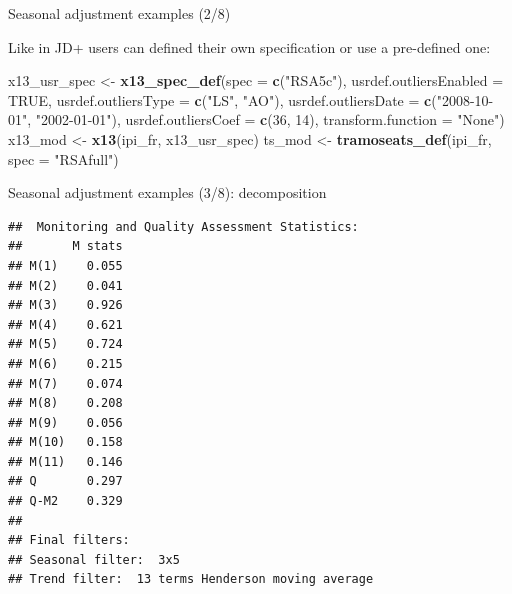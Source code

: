 \documentclass[10pt,xcolor=table,color={dvipsnames,usenames},ignorenonframetext,usepdftitle=false,french]{beamer}
\newenvironment{Shaded}{\begin{snugshade}}{\end{snugshade}}
\newcommand{\DataTypeTok}[1]{\textcolor[rgb]{0.13,0.29,0.53}{#1}}
\newcommand{\DecValTok}[1]{\textcolor[rgb]{0.00,0.00,0.81}{#1}}
\newcommand{\KeywordTok}[1]{\textcolor[rgb]{0.13,0.29,0.53}{\textbf{#1}}}
\newcommand{\NormalTok}[1]{#1}
\newcommand{\OperatorTok}[1]{\textcolor[rgb]{0.81,0.36,0.00}{\textbf{#1}}}
\newcommand{\OtherTok}[1]{\textcolor[rgb]{0.56,0.35,0.01}{#1}}
\newcommand{\StringTok}[1]{\textcolor[rgb]{0.31,0.60,0.02}{#1}}
\begin{document}
\begin{frame}[fragile]{Seasonal adjustment examples (2/8)}
\protect\hypertarget{seasonal-adjustment-examples-28}{}

Like in JD+ users can defined their own specification or use a
pre-defined one:

\footnotesize

\begin{Shaded}
\begin{Highlighting}[]
\NormalTok{x13_usr_spec <-}\StringTok{ }\KeywordTok{x13_spec_def}\NormalTok{(}\DataTypeTok{spec =} \KeywordTok{c}\NormalTok{(}\StringTok{"RSA5c"}\NormalTok{),}
                             \DataTypeTok{usrdef.outliersEnabled =} \OtherTok{TRUE}\NormalTok{,}
                             \DataTypeTok{usrdef.outliersType =} \KeywordTok{c}\NormalTok{(}\StringTok{"LS"}\NormalTok{, }\StringTok{"AO"}\NormalTok{),}
                             \DataTypeTok{usrdef.outliersDate =} \KeywordTok{c}\NormalTok{(}\StringTok{"2008-10-01"}\NormalTok{,}
                                                     \StringTok{"2002-01-01"}\NormalTok{),}
                             \DataTypeTok{usrdef.outliersCoef =} \KeywordTok{c}\NormalTok{(}\DecValTok{36}\NormalTok{, }\DecValTok{14}\NormalTok{),}
                             \DataTypeTok{transform.function =} \StringTok{"None"}\NormalTok{)}
\NormalTok{x13_mod <-}\StringTok{ }\KeywordTok{x13}\NormalTok{(ipi_fr, x13_usr_spec)}
\NormalTok{ts_mod <-}\StringTok{ }\KeywordTok{tramoseats_def}\NormalTok{(ipi_fr, }\DataTypeTok{spec =} \StringTok{"RSAfull"}\NormalTok{)}
\end{Highlighting}
\end{Shaded}

\end{frame}

\begin{frame}[fragile]{Seasonal adjustment examples (3/8):
decomposition}
\protect\hypertarget{seasonal-adjustment-examples-38-decomposition}{}

\footnotesize

\begin{Shaded}
\end{Shaded}

\begin{verbatim}
##  Monitoring and Quality Assessment Statistics:  
##       M stats
## M(1)    0.055
## M(2)    0.041
## M(3)    0.926
## M(4)    0.621
## M(5)    0.724
## M(6)    0.215
## M(7)    0.074
## M(8)    0.208
## M(9)    0.056
## M(10)   0.158
## M(11)   0.146
## Q       0.297
## Q-M2    0.329
## 
## Final filters: 
## Seasonal filter:  3x5
## Trend filter:  13 terms Henderson moving average
\end{verbatim}

\end{frame}
\end{document}
